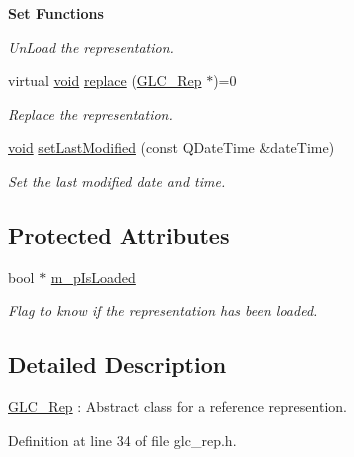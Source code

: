 \begin{Indent}{\bf Set Functions}
\begin{DoxyCompactItemize}
\begin{DoxyCompactList}\small\item\em Un\-Load the representation. \end{DoxyCompactList}\item 
virtual \hyperlink{group___u_a_v_objects_plugin_ga444cf2ff3f0ecbe028adce838d373f5c}{void} \hyperlink{class_g_l_c___rep_ab56d10be46fbce65891c8a38905bb5b6}{replace} (\hyperlink{class_g_l_c___rep}{G\-L\-C\-\_\-\-Rep} $\ast$)=0
\begin{DoxyCompactList}\small\item\em Replace the representation. \end{DoxyCompactList}\item 
\hyperlink{group___u_a_v_objects_plugin_ga444cf2ff3f0ecbe028adce838d373f5c}{void} \hyperlink{class_g_l_c___rep_ac6c9bf007be75641152b3e2c8740e6ea}{set\-Last\-Modified} (const Q\-Date\-Time \&date\-Time)
\begin{DoxyCompactList}\small\item\em Set the last modified date and time. \end{DoxyCompactList}\end{DoxyCompactItemize}
\end{Indent}
\subsection*{Protected Attributes}
\begin{DoxyCompactItemize}
\item 
bool $\ast$ \hyperlink{class_g_l_c___rep_ab067292d064ee0dbf11544379f0a92ad}{m\-\_\-p\-Is\-Loaded}
\begin{DoxyCompactList}\small\item\em Flag to know if the representation has been loaded. \end{DoxyCompactList}\end{DoxyCompactItemize}


\subsection{Detailed Description}
\hyperlink{class_g_l_c___rep}{G\-L\-C\-\_\-\-Rep} \-: Abstract class for a reference represention. 

Definition at line 34 of file glc\-\_\-rep.\-h.



